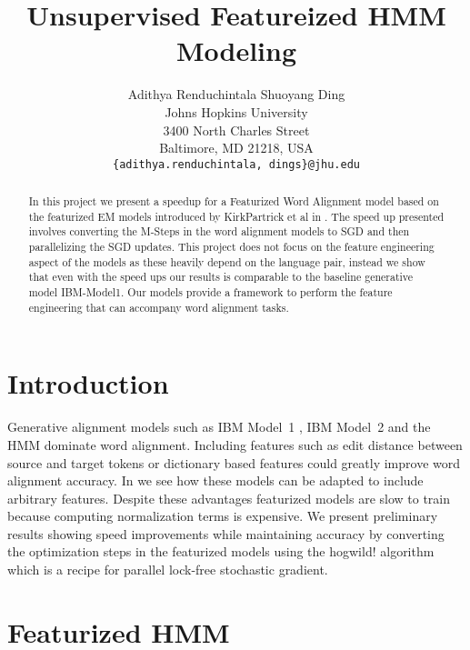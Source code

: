 \documentclass[11pt,letterpaper]{article}
\title{Unsupervised Featureized HMM Modeling}
\author{Adithya Renduchintala
  \quad\quad Shuoyang Ding\\
  Johns Hopkins University\\
  3400 North Charles Street\\
  Baltimore, MD 21218, USA\\
  {\tt \{adithya.renduchintala, dings\}@jhu.edu}}
\date{}
\begin{document}
\maketitle
\begin{abstract}
In this project we present a speedup for a Featurized Word Alignment model based on the featurized EM models introduced by KirkPartrick et al in \cite{berg2010painless}. The speed up presented involves converting the M-Steps in the word alignment models to SGD and then parallelizing the SGD updates. This project does not focus on the feature engineering aspect of the models as these heavily depend on the language pair, instead we show that even with the speed ups our results is comparable to the baseline generative model IBM-Model1. Our models provide a framework to perform the feature engineering that can accompany word alignment tasks.
\end{abstract}

\section{Introduction}
Generative alignment models such as IBM Model~1 \cite{brown1993mathematics}, IBM Model~2 and the HMM dominate word alignment. Including features such as edit distance between source and target tokens or dictionary based features could greatly improve word alignment accuracy. In \cite{berg2010painless} we see how these models can be adapted to include arbitrary features. Despite these advantages featurized models are slow to train because  computing normalization terms is expensive. We present preliminary results showing speed improvements while maintaining accuracy by converting the optimization steps in the featurized models using the hogwild! algorithm \cite{recht2011hogwild} which is a recipe for parallel lock-free stochastic gradient.

\section{Featurized HMM}
\end{document}

